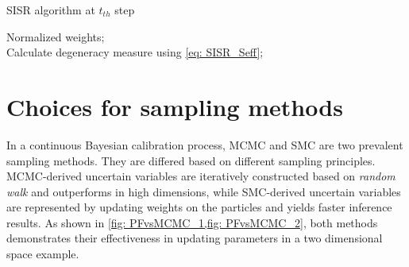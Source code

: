 \begin{algorithm}    
    \caption{\acrlong{SISR} algorithm at $t_{th}$ step}
    \label{Algorithm:SISR}
        Normalized weights;\\
        Calculate degeneracy measure using \cref{eq: SISR_Seff};\\
\end{algorithm}



\section{Choices for sampling methods}

In a continuous Bayesian calibration process, \acrshort{MCMC} and \acrshort{SMC} are two prevalent sampling methods. They are differed based on different sampling principles. \acrshort{MCMC}-derived uncertain variables are iteratively constructed based on \textit{random walk} and outperforms in high dimensions, while \acrshort{SMC}-derived uncertain variables are represented by updating weights on the particles and yields faster inference results. As shown in \cref{fig: PFvsMCMC_1,fig: PFvsMCMC_2}, both methods demonstrates their effectiveness in updating parameters in a two dimensional space example.

